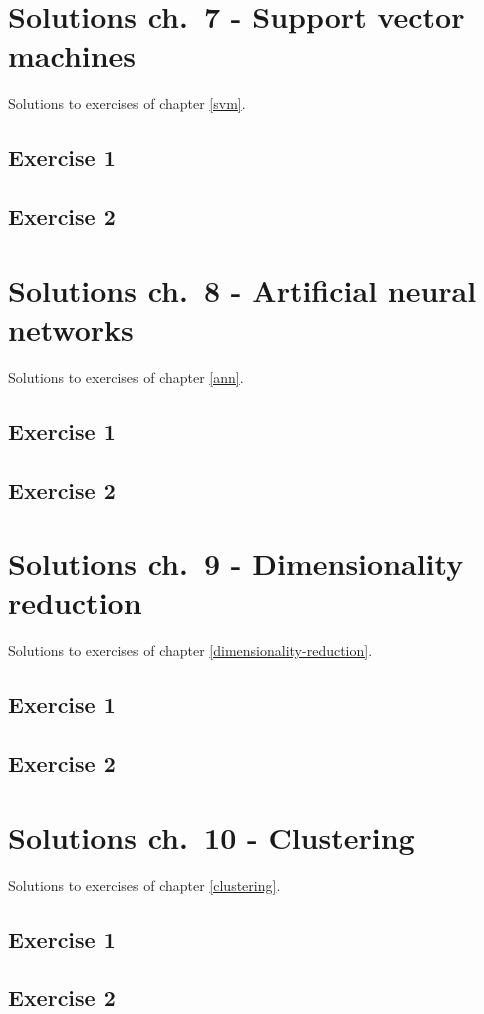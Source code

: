 \documentclass[]{book}
\theoremstyle{definition}
\theoremstyle{definition}
\theoremstyle{definition}
\theoremstyle{remark}
\begin{document}
\chapter{Solutions ch.~7 - Support vector machines}\label{solutions-svm}

Solutions to exercises of chapter \ref{svm}.

\section{Exercise 1}\label{exercise-1-4}

\section{Exercise 2}\label{exercise-2-4}

\chapter{Solutions ch.~8 - Artificial neural
networks}\label{solutions-ann}

Solutions to exercises of chapter \ref{ann}.

\section{Exercise 1}\label{exercise-1-5}

\section{Exercise 2}\label{exercise-2-5}

\chapter{Solutions ch.~9 - Dimensionality
reduction}\label{solutions-dimensionality-reduction}

Solutions to exercises of chapter \ref{dimensionality-reduction}.

\section{Exercise 1}\label{exercise-1-6}

\section{Exercise 2}\label{exercise-2-6}

\chapter{Solutions ch.~10 - Clustering}\label{solutions-clustering}

Solutions to exercises of chapter \ref{clustering}.

\section{Exercise 1}\label{exercise-1-7}

\section{Exercise 2}\label{exercise-2-7}


\end{document}

